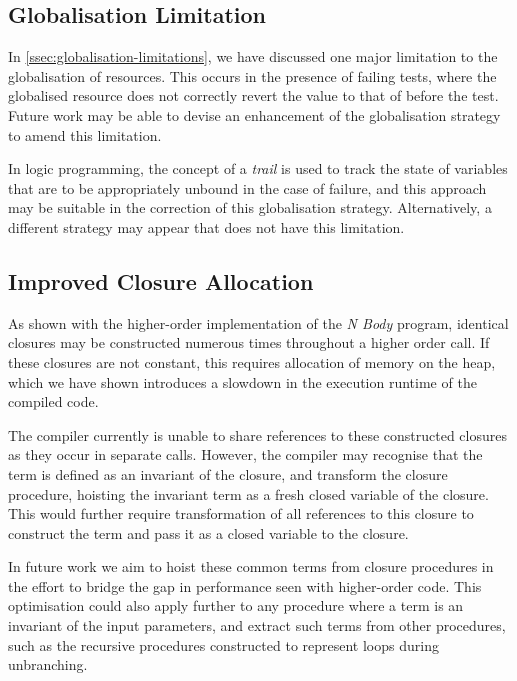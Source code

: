 \subsection{Globalisation Limitation}

In \cref{ssec:globalisation-limitations}, we have discussed one major limitation to the globalisation of resources. This occurs in the presence of failing tests, where the globalised resource does not correctly revert the value to that of before the test. Future work may be able to devise an enhancement of the globalisation strategy to amend this limitation. 

In logic programming, the concept of a \textit{trail} is used to track the state of variables that are to be appropriately unbound in the case of failure, and this approach may be suitable in the correction of this globalisation strategy. Alternatively, a different strategy may appear that does not have this limitation.

\subsection{Improved Closure Allocation}

As shown with the higher-order implementation of the \textit{N Body} program, identical closures may be constructed numerous times throughout a higher order call. If these closures are not constant, this requires allocation of memory on the heap, which we have shown introduces a slowdown in the execution runtime of the compiled code.

The compiler currently is unable to share references to these constructed closures as they occur in separate calls. However, the compiler may recognise that the term is defined as an invariant of the closure, and transform the closure procedure, hoisting the invariant term as a fresh closed variable of the closure. This would further require transformation of all references to this closure to construct the term and pass it as a closed variable to the closure.

In future work we aim to hoist these common terms from closure procedures in the effort to bridge the gap in performance seen with higher-order code. This optimisation could also apply further to any procedure where a term is an invariant of the input parameters, and extract such terms from other procedures, such as the recursive procedures constructed to represent loops during unbranching.
